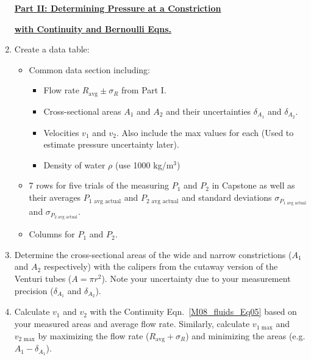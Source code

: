 \begin{enumerate}
\underline{\textbf{Part II: Determining Pressure at a Constriction}}

\hspace{6mm}\underline{\textbf{with Continuity and Bernoulli Eqns.}}

\item Create a data table:
\begin{itemize}
    \item Common data section including:
    \begin{itemize}
        \item Flow rate $R_\text{avg} \pm \sigma_R$ from Part I.
        \item Cross-sectional areas $A_1$ and $A_2$ and their uncertainties $\delta_{A_1}$ and $\delta_{A_2}$.
        \item Velocities $v_1$ and $v_2$. Also include the max values for each (Used to estimate pressure uncertainty later).
        \item Density of water $\rho$ (use 1000 kg/m$^3$)
    \end{itemize}

    \item 7 rows for five trials of the measuring $P_1$ and $P_2$ in Capstone as well as their averages $P_{1\text{ avg actual}}$ and $P_{2\text{ avg actual}}$ and standard deviations $\sigma_{P_{1\text{ avg actual}}}$ and $\sigma_{P_{2\text{ avg actual}}}$.
    \item Columns for $P_1$ and $P_2$.
\end{itemize}

    \item Determine the cross-sectional areas of the wide and narrow constrictions ($A_1$ and $A_2$ respectively) with the calipers from the cutaway version of the Venturi tubes ($A = \pi r^2$). Note your uncertainty due to your measurement precision ($\delta_{A_1}$ and $\delta_{A_2}$).
    \item Calculate $v_1$ and $v_2$ with the Continuity Eqn.~\ref{M08_fluids_Eq05} based on your measured areas and average flow rate. Similarly, calculate $v_{1\text{ max}}$ and $v_{2\text{ max}}$ by maximizing the flow rate ($R_\text{avg} + \sigma_R$) and minimizing the areas (e.g. $A_1 - \delta_{A_1}$).


\end{enumerate}
